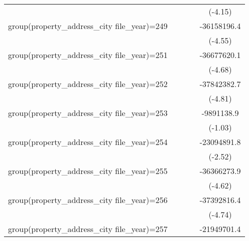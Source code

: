 {\begin{tabular}{l*{4}{c}}
                    &                     &                     &                     &     (-4.15)         \\
\addlinespace
group(property\_address\_city file\_year)=249&                     &                     &                     & -36158196.4\sym{***}\\
                    &                     &                     &                     &     (-4.55)         \\
\addlinespace
group(property\_address\_city file\_year)=251&                     &                     &                     & -36677620.1\sym{***}\\
                    &                     &                     &                     &     (-4.68)         \\
\addlinespace
group(property\_address\_city file\_year)=252&                     &                     &                     & -37842382.7\sym{***}\\
                    &                     &                     &                     &     (-4.81)         \\
\addlinespace
group(property\_address\_city file\_year)=253&                     &                     &                     &  -9891138.9         \\
                    &                     &                     &                     &     (-1.03)         \\
\addlinespace
group(property\_address\_city file\_year)=254&                     &                     &                     & -23094891.8\sym{*}  \\
                    &                     &                     &                     &     (-2.52)         \\
\addlinespace
group(property\_address\_city file\_year)=255&                     &                     &                     & -36366273.9\sym{***}\\
                    &                     &                     &                     &     (-4.62)         \\
\addlinespace
group(property\_address\_city file\_year)=256&                     &                     &                     & -37392816.4\sym{***}\\
                    &                     &                     &                     &     (-4.74)         \\
\addlinespace
group(property\_address\_city file\_year)=257&                     &                     &                     & -21949701.4         \\

\end{tabular}}
